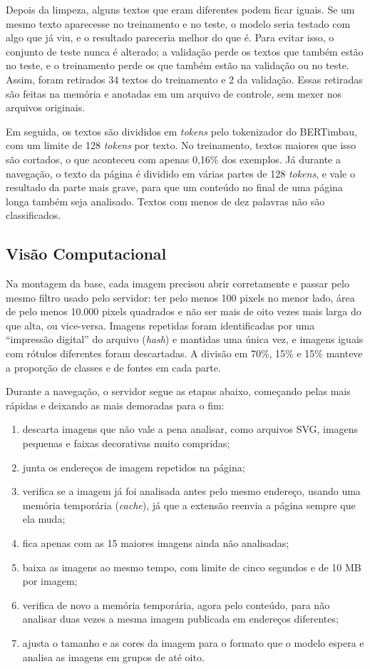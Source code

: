 \documentclass[
    12pt,           %
    oneside,        %
    a4paper,        %
    chapter=TITLE,  %
    english,        %
    brazil          %
]{abntex2}
\begin{document}
Depois da limpeza, alguns textos que eram diferentes podem ficar iguais. Se um
mesmo texto aparecesse no treinamento e no teste, o modelo seria testado com
algo que já viu, e o resultado pareceria melhor do que é. Para evitar isso, o
conjunto de teste nunca é alterado; a validação perde os textos que também
estão no teste, e o treinamento perde os que também estão na validação ou no
teste. Assim, foram retirados 34 textos do treinamento e 2 da validação. Essas
retiradas são feitas na memória e anotadas em um arquivo de controle, sem
mexer nos arquivos originais.

Em seguida, os textos são divididos em \textit{tokens} pelo tokenizador do
BERTimbau, com um limite de 128 \textit{tokens} por texto. No treinamento,
textos maiores que isso são cortados, o que aconteceu com apenas 0,16\% dos
exemplos. Já durante a navegação, o texto da página é dividido em várias
partes de 128 \textit{tokens}, e vale o resultado da parte mais grave, para
que um conteúdo no final de uma página longa também seja analisado. Textos com
menos de dez palavras não são classificados.
\subsection{Visão Computacional}

Na montagem da base, cada imagem precisou abrir corretamente e passar pelo
mesmo filtro usado pelo servidor: ter pelo menos 100 pixels no menor lado,
área de pelo menos 10.000 pixels quadrados e não ser mais de oito vezes mais
larga do que alta, ou vice-versa. Imagens repetidas foram identificadas por
uma ``impressão digital'' do arquivo (\textit{hash}) e mantidas uma única vez,
e imagens iguais com rótulos diferentes foram descartadas. A divisão em 70\%,
15\% e 15\% manteve a proporção de classes e de fontes em cada parte.

Durante a navegação, o servidor segue as etapas abaixo, começando pelas mais
rápidas e deixando as mais demoradas para o fim:
\begin{enumerate}
    \item descarta imagens que não vale a pena analisar, como arquivos SVG,
    imagens pequenas e faixas decorativas muito compridas;
    \item junta os endereços de imagem repetidos na página;
    \item verifica se a imagem já foi analisada antes pelo mesmo endereço,
    usando uma memória temporária (\textit{cache}), já que a extensão reenvia
    a página sempre que ela muda;
    \item fica apenas com as 15 maiores imagens ainda não analisadas;
    \item baixa as imagens ao mesmo tempo, com limite de cinco segundos e de
    10 MB por imagem;
    \item verifica de novo a memória temporária, agora pelo conteúdo, para não
    analisar duas vezes a mesma imagem publicada em endereços diferentes;
    \item ajusta o tamanho e as cores da imagem para o formato que o modelo
    espera e analisa as imagens em grupos de até oito.
\end{enumerate}
\end{document}
